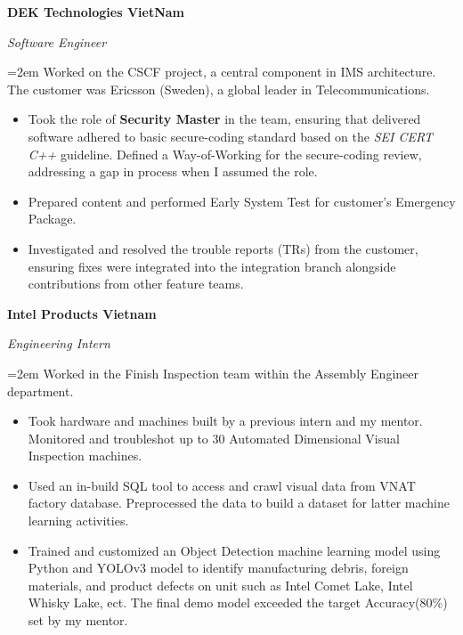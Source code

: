 \documentclass[10pt]{article}
\newcommand{\work}[4]{
  \noindent  \textbf{#1}
  \hfill 
\framebox{%
  \parbox{9em}{%
  \centering\textbf{#2}}} \par
  \noindent \textit{#3} \par
  \vspace*{0.5em}
  \noindent\hangindent=2em\hangafter=0 \small #4 
\normalsize \par}
\begin{document}
\work{DEK Technologies VietNam}
{Nov 2021--May 2023}
{Software Engineer}
{Worked on the CSCF project, a central component in IMS architecture.
 The customer was Ericsson (Sweden), a global leader in Telecommunications.

\begin{itemize}
    \item Took the role of \textbf{Security Master} in the team, ensuring that delivered software adhered to basic secure-coding standard based on the \textit{SEI CERT C++} guideline.
     Defined a Way-of-Working for the secure-coding review, addressing a gap in process when I assumed the role.
    \item Prepared content and performed Early System Test for customer's Emergency Package.
    \item Investigated and resolved the trouble reports (TRs) from the customer, ensuring fixes were integrated into the integration branch alongside contributions from other feature teams.
\end{itemize}}


\work{Intel Products Vietnam}
{Aug 2020--Feb 2021}
{Engineering Intern}
{Worked in the Finish Inspection team within the Assembly Engineer department.
\begin{itemize}
    \item Took hardware and machines built by a previous intern and my mentor. 
    Monitored and troubleshot up to 30 Automated Dimensional Visual Inspection machines.
    \item Used an in-build SQL tool to access and crawl visual data from VNAT factory database. Preprocessed the data to build a dataset for latter machine learning activities.
    \item Trained and customized an Object Detection machine learning model using Python and YOLOv3 model to identify manufacturing debris, foreign materials, and product defects on unit such as Intel Comet Lake, Intel Whisky Lake, ect.
    The final demo model exceeded the target Accuracy(80\%) set by my mentor.
\end{itemize}}

\end{document}
